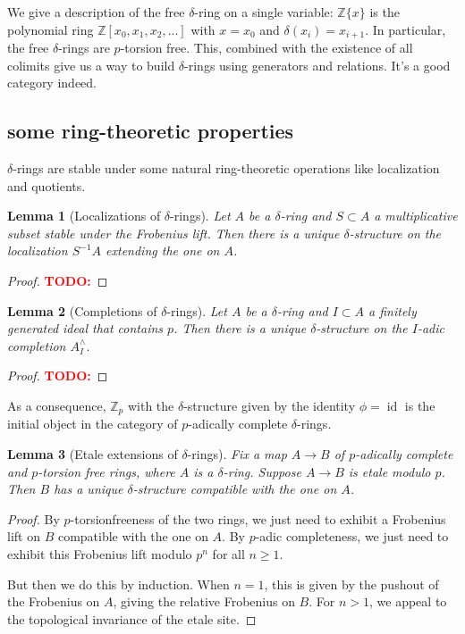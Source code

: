 \documentclass[12pt]{amsproc}
\newtheorem{lemma}{Lemma}
\theoremstyle{definition}
\newcommand{\Z}{\mathbb{Z}}
\newcommand{\sma}{\wedge}
\newcommand{\ra}{\rightarrow}
\DeclareMathOperator{\id}{id}
\newcommand{\todo}[1]{\textcolor{red}{\textbf{TODO:}\text{[#1]}}}
\begin{document}
We give a description of the free $\delta$-ring on a single variable: $\Z\{x\}$ is the polynomial ring $\Z[x_0,x_1,x_2,...]$ with $x=x_0$ and $\delta(x_i)=x_{i+1}$. In particular, the free $\delta$-rings are $p$-torsion free. This, combined with the existence of all colimits give us a way to build $\delta$-rings using generators and relations. It's a good category indeed.

\subsection{some ring-theoretic properties}
$\delta$-rings are stable under some natural ring-theoretic operations like localization and quotients.

\begin{lemma}[Localizations of $\delta$-rings] Let $A$ be a $\delta$-ring and $S\subset A$ a multiplicative subset stable under the Frobenius lift. Then there is a unique $\delta$-structure on the localization $S^{-1}A$ extending the one on $A$.
\end{lemma}
\begin{proof}\todo{prove this}\end{proof}

\begin{lemma}[Completions of $\delta$-rings] Let $A$ be a $\delta$-ring and $I\subset A$ a finitely generated ideal that contains $p$. Then there is a unique $\delta$-structure on the $I$-adic completion $A^{\sma}_I$.
\end{lemma}
\begin{proof}\todo{prove this}\end{proof}

As a consequence, $\Z_p$ with the $\delta$-structure given by the identity $\phi=\id$ is the initial object in the category of $p$-adically complete $\delta$-rings.

\begin{lemma}[Etale extensions of $\delta$-rings] Fix a map $A\ra B$ of $p$-adically complete and $p$-torsion free rings, where $A$ is a $\delta$-ring. Suppose $A\ra B$ is etale modulo $p$. Then $B$ has a unique $\delta$-structure compatible with the one on $A$.
\end{lemma}
\begin{proof} By $p$-torsionfreeness of the two rings, we just need to exhibit a Frobenius lift on $B$ compatible with the one on $A$. By $p$-adic completeness, we just need to exhibit this Frobenius lift modulo $p^n$ for all $n\ge 1$.

But then we do this by induction. When $n=1$, this is given by the pushout of the Frobenius on $A$, giving the relative Frobenius on $B$. For $n>1$, we appeal to the topological invariance of the etale site.
\end{proof}
\end{document}
